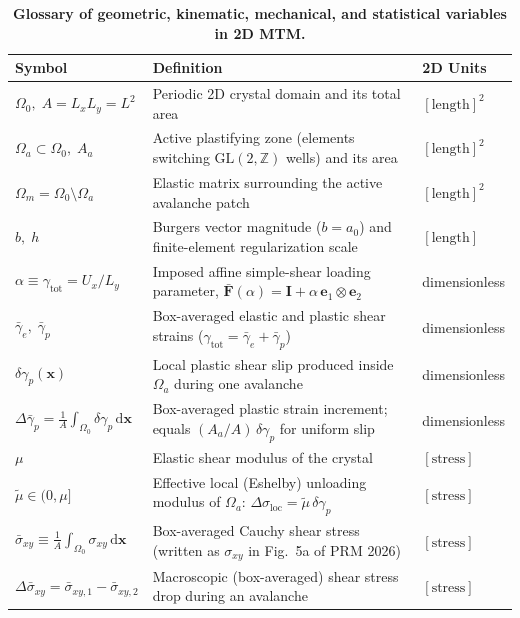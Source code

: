 \documentclass[11pt,a4paper]{article}
\newcommand{\Z}{\mathbb{Z}}
\newcommand{\dsigbar}{\Delta\bar{\sigma}_{xy}}
\newcommand{\dsigloc}{\Delta\sigma_{\mathrm{loc}}}
\newcommand{\dgamp}{\delta\gamma_p}
\newcommand{\mutil}{\tilde{\mu}}
\begin{document}
\begin{table}[ht!]
\centering
\caption{\textbf{Glossary of geometric, kinematic, mechanical, and statistical variables in 2D MTM.}}
\label{tab:symbols}
\footnotesize
\setlength{\tabcolsep}{4.5pt}
\begin{tabular}{@{}p{4.35cm}p{9.25cm}p{2.1cm}@{}}
\toprule
\textbf{Symbol} & \textbf{Definition} & \textbf{2D Units} \\
\midrule
$\Omega_0,\; A = L_x L_y = L^2$ & Periodic 2D crystal domain and its total area & $[\text{length}]^2$ \\
$\Omega_a \subset \Omega_0,\; A_a$ & Active plastifying zone (elements switching $\mathrm{GL}(2,\Z)$ wells) and its area & $[\text{length}]^2$ \\
$\Omega_m = \Omega_0 \setminus \Omega_a$ & Elastic matrix surrounding the active avalanche patch & $[\text{length}]^2$ \\
$b,\; h$ & Burgers vector magnitude ($b=a_0$) and finite-element regularization scale & $[\text{length}]$ \\
\midrule
$\alpha \equiv \gamma_{\mathrm{tot}} = U_x/L_y$ & Imposed affine simple-shear loading parameter, $\bar{\mathbf{F}}(\alpha)=\mathbf{I}+\alpha\,\mathbf{e}_1\otimes\mathbf{e}_2$ & dimensionless \\
$\bar{\gamma}_e,\; \bar{\gamma}_p$ & Box-averaged elastic and plastic shear strains ($\gamma_{\mathrm{tot}}=\bar{\gamma}_e+\bar{\gamma}_p$) & dimensionless \\
$\dgamp(\mathbf{x})$ & Local plastic shear slip produced inside $\Omega_a$ during one avalanche & dimensionless \\
$\Delta\bar{\gamma}_p = \frac{1}{A}\int_{\Omega_0}\dgamp\,\mathrm{d}\mathbf{x}$ & Box-averaged plastic strain increment; equals $(A_a/A)\,\dgamp$ for uniform slip & dimensionless \\
\midrule
$\mu$ & Elastic shear modulus of the crystal & $[\text{stress}]$ \\
$\mutil \in (0,\mu]$ & Effective local (Eshelby) unloading modulus of $\Omega_a$: $\dsigloc = \mutil\,\dgamp$ & $[\text{stress}]$ \\
$\bar{\sigma}_{xy} \equiv \frac{1}{A}\int_{\Omega_0}\sigma_{xy}\,\mathrm{d}\mathbf{x}$ & Box-averaged Cauchy shear stress (written as $\sigma_{xy}$ in Fig.~5a of PRM 2026) & $[\text{stress}]$ \\
$\dsigbar = \bar{\sigma}_{xy,1}-\bar{\sigma}_{xy,2}$ & Macroscopic (box-averaged) shear stress drop during an avalanche & $[\text{stress}]$ \\

\end{tabular}
\end{table}
\end{document}
